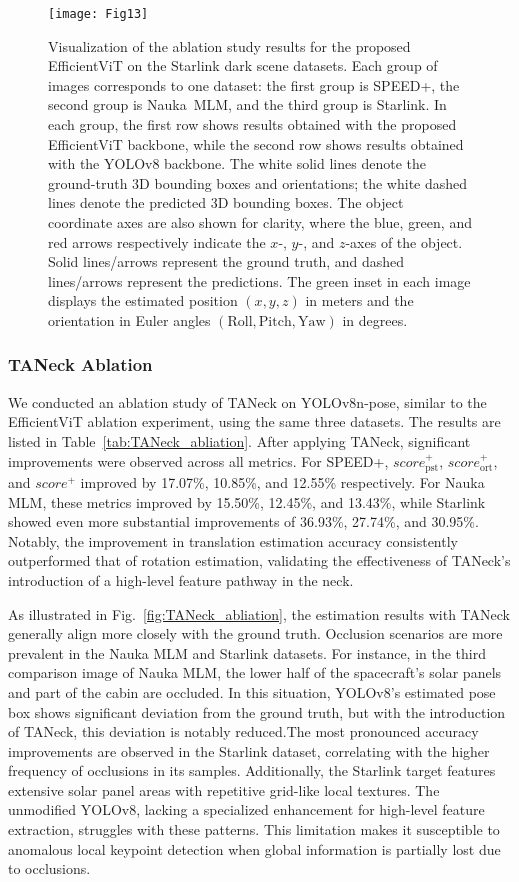 \documentclass[a4paper,fleqn]{cas-sc}
\begin{document}
\begin{figure}[!htbp]
    \centering
    \texttt{[image: Fig13]}
    \caption{Visualization of the ablation study results for the proposed EfficientViT on the Starlink dark scene datasets. 
    Each group of images corresponds to one dataset: the first group is SPEED+, the second group is Nauka~MLM, and the third group is Starlink. 
    In each group, the first row shows results obtained with the proposed EfficientViT backbone, while the second row shows results obtained with the YOLOv8 backbone. 
    The white solid lines denote the ground-truth 3D bounding boxes and orientations; the white dashed lines denote the predicted 3D bounding boxes. 
    The object coordinate axes are also shown for clarity, where the blue, green, and red arrows respectively indicate the $x$-, $y$-, and $z$-axes of the object. 
    Solid lines/arrows represent the ground truth, and dashed lines/arrows represent the predictions. 
    The green inset in each image displays the estimated position $(x,y,z)$ in meters and the orientation in Euler angles $(\mathrm{Roll}, \mathrm{Pitch}, \mathrm{Yaw})$ in degrees.}
    \label{fig:dark_scene_comp}
\end{figure}


\subsubsection{TANeck Ablation}
We conducted an ablation study of TANeck on YOLOv8n-pose, similar to the EfficientViT ablation experiment, using the same three datasets. The results are listed in Table~\ref{tab:TANeck_abliation}. After applying TANeck, significant improvements were observed across all metrics. For SPEED+, $score_{\text{pst}}^+$, $score_{\text{ort}}^+$, and $score^+$ improved by 17.07\%, 10.85\%, and 12.55\% respectively. For Nauka MLM, these metrics improved by 15.50\%, 12.45\%, and 13.43\%, while Starlink showed even more substantial improvements of 36.93\%, 27.74\%, and 30.95\%. Notably, the improvement in translation estimation accuracy consistently outperformed that of rotation estimation, validating the effectiveness of TANeck's introduction of a high-level feature pathway in the neck.

As illustrated in Fig.~\ref{fig:TANeck_abliation}, the estimation results with TANeck generally align more closely with the ground truth. Occlusion scenarios are more prevalent in the Nauka MLM and Starlink datasets. For instance, in the third comparison image of Nauka MLM, the lower half of the spacecraft's solar panels and part of the cabin are occluded. In this situation, YOLOv8's estimated pose box shows significant deviation from the ground truth, but with the introduction of TANeck, this deviation is notably reduced.The most pronounced accuracy improvements are observed in the Starlink dataset, correlating with the higher frequency of occlusions in its samples. Additionally, the Starlink target features extensive solar panel areas with repetitive grid-like local textures. The unmodified YOLOv8, lacking a specialized enhancement for high-level feature extraction, struggles with these patterns. This limitation makes it susceptible to anomalous local keypoint detection when global information is partially lost due to occlusions.
\end{document}
